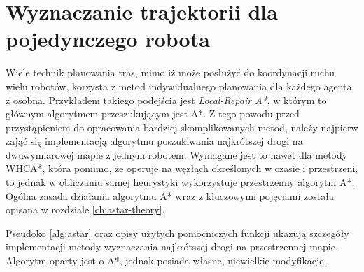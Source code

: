 \section{Wyznaczanie trajektorii dla pojedynczego robota}
\label{ch:alg-single-astar}

Wiele technik planowania tras, mimo iż może posłużyć do koordynacji ruchu wielu robotów, korzysta z metod indywidualnego planowania dla każdego agenta z osobna. Przykładem takiego podejścia jest {\it Local-Repair A*}, w którym to głównym algorytmem przeszukującym jest A*.
Z tego powodu przed przystąpieniem do opracowania bardziej skomplikowanych metod, należy najpierw zająć się implementacją algorytmu poszukiwania najkrótszej drogi na dwuwymiarowej mapie z jednym robotem. Wymagane jest to nawet dla metody WHCA*, która pomimo, że operuje na węzłąch określonych w czasie i przestrzeni, to jednak w obliczaniu samej heurystyki wykorzystuje przestrzenny algorytm A*.
Ogólna zasada działania algorytmu A* wraz z kluczowymi pojęciami została opisana w rozdziale \ref{ch:astar-theory}.

Pseudoko \ref{alg:astar} oraz opisy użytych pomocniczych funkcji ukazują szczegóły implementacji metody wyznaczania najkrótszej drogi na przestrzennej mapie. Algorytm oparty jest o A*, jednak posiada własne, niewielkie modyfikacje.

